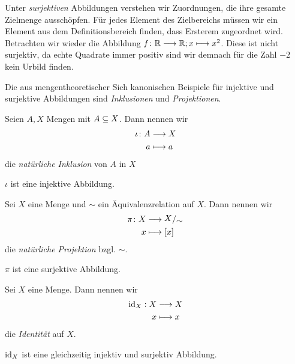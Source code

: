 Unter \emph{surjektiven} Abbildungen verstehen wir Zuordnungen, die ihre gesamte
Zielmenge ausschöpfen. Für jedes Element des Zielbereichs müssen wir ein Element
aus dem Definitionsbereich finden, dass Ersterem zugeordnet wird. Betrachten wir
wieder die Abbildung $f\colon \mathbb R \longrightarrow \mathbb R; x \longmapsto x^{2}$. Diese ist nicht
surjektiv, da echte Quadrate immer positiv sind wir demnach für die Zahl $-2$
kein Urbild finden.

Die aus mengentheoretischer Sich kanonischen Beispiele für injektive und
surjektive Abbildungen sind \emph{Inklusionen} und \emph{Projektionen}. 


\begin{defin}
  Seien $A,X$ Mengen mit $A\subseteq X$. Dann nennen wir
  \begin{align*}
    \iota\colon A &\longrightarrow X \\
    a &\longmapsto a
  \end{align*}
  die \emph{natürliche Inklusion} von $A$ in $X$
\end{defin}

\begin{anm}
  $\iota$ ist eine injektive Abbildung.
\end{anm}


\begin{defin}
  Sei $X$ eine Menge und $\sim$ ein Äquivalenzrelation auf $X$. Dann nennen
  wir
  \begin{align*}
    \pi \col X &\lra \quotspace{X}{\sim} \\
    x &\lmt [x]
  \end{align*}
  die \emph{natürliche Projektion} bzgl. $\sim$.
\end{defin}

\begin{anm}
  $\pi$ ist eine surjektive Abbildung.
\end{anm}


\begin{defin}
  Sei $X$ eine Menge. Dann nennen wir
  \begin{align*}
    \operatorname{id}_{X}: X &\longrightarrow X \\
    x &\longmapsto x
  \end{align*}
  die \emph{Identität} auf $X$.
\end{defin}


\begin{anm}
  $\operatorname{id}_{X}$ ist eine gleichzeitig injektiv und surjektiv Abbildung.
\end{anm}

